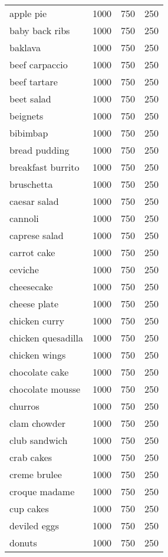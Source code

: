 \begin{center}
\begin{longtable}{|l|l|l|l|}
        apple pie & 1000 & 750 & 250 \\
        baby back ribs & 1000 & 750 & 250 \\
        baklava & 1000 & 750 & 250 \\
        beef carpaccio & 1000 & 750 & 250 \\
        beef tartare & 1000 & 750 & 250 \\
        beet salad & 1000 & 750 & 250 \\
        beignets & 1000 & 750 & 250 \\
        bibimbap & 1000 & 750 & 250 \\
        bread pudding & 1000 & 750 & 250 \\
        breakfast burrito & 1000 & 750 & 250 \\
        bruschetta & 1000 & 750 & 250 \\
        caesar salad & 1000 & 750 & 250 \\
        cannoli & 1000 & 750 & 250 \\
        caprese salad & 1000 & 750 & 250 \\
        carrot cake & 1000 & 750 & 250 \\
        ceviche & 1000 & 750 & 250 \\
        cheesecake & 1000 & 750 & 250 \\
        cheese plate & 1000 & 750 & 250 \\
        chicken curry & 1000 & 750 & 250 \\
        chicken quesadilla & 1000 & 750 & 250 \\
        chicken wings & 1000 & 750 & 250 \\
        chocolate cake & 1000 & 750 & 250 \\
        chocolate mousse & 1000 & 750 & 250 \\
        churros & 1000 & 750 & 250 \\
        clam chowder & 1000 & 750 & 250 \\
        club sandwich & 1000 & 750 & 250 \\
        crab cakes & 1000 & 750 & 250 \\
        creme brulee & 1000 & 750 & 250 \\
        croque madame & 1000 & 750 & 250 \\
        cup cakes & 1000 & 750 & 250 \\
        deviled eggs & 1000 & 750 & 250 \\
        donuts & 1000 & 750 & 250 \\

\end{longtable}
\end{center}
